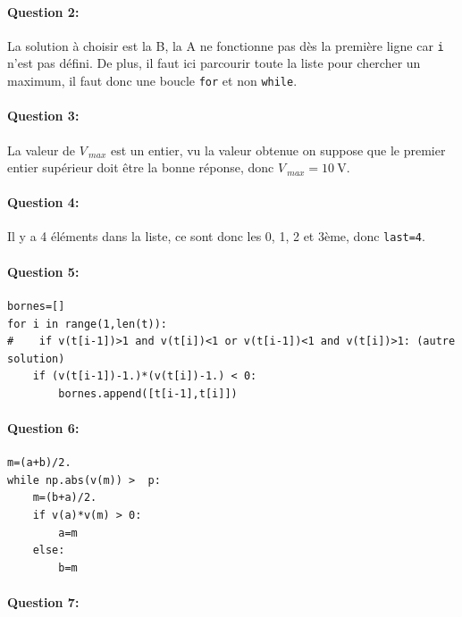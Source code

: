 \paragraph{Question 2:}

La solution à choisir est la B, la A ne fonctionne pas dès la première ligne car \verb?i? n'est pas défini. De plus, il faut ici parcourir toute la liste pour chercher un maximum, il faut donc une boucle \verb?for? et non \verb?while?.

\paragraph{Question 3:}

La valeur de $V_{\ max}$ est un entier, vu la valeur obtenue on suppose que le premier entier supérieur doit être la bonne réponse, donc $V_{\ max}=10~\textrm{V}$.

\paragraph{Question 4:}

Il y a 4 éléments dans la liste, ce sont donc les 0, 1, 2 et 3ème, donc \verb?last=4?.

\paragraph{Question 5:}

\begin{center}
\begin{verbatim}
bornes=[]
for i in range(1,len(t)):
#    if v(t[i-1])>1 and v(t[i])<1 or v(t[i-1])<1 and v(t[i])>1: (autre solution)
    if (v(t[i-1])-1.)*(v(t[i])-1.) < 0:
        bornes.append([t[i-1],t[i]])
\end{verbatim}
\end{center}

\paragraph{Question 6:}

\begin{center}
\begin{verbatim}
m=(a+b)/2.
while np.abs(v(m)) >  p:
    m=(b+a)/2.
    if v(a)*v(m) > 0:
        a=m
    else:
        b=m
\end{verbatim}
\end{center}

\paragraph{Question 7:}


